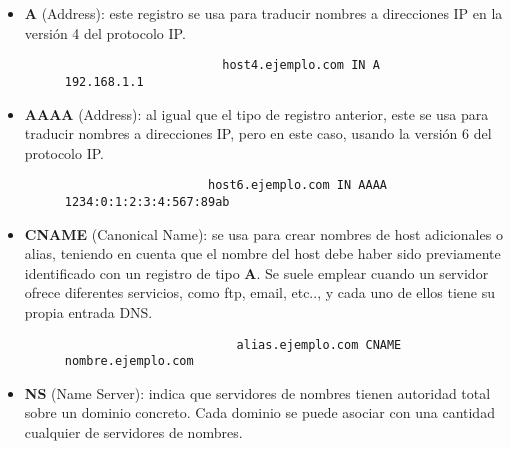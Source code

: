 \begin{itemize}
    \item \textbf{A} (Address): este registro se usa para traducir nombres a direcciones IP en la versión 4 del protocolo IP.

    \begin{figure}[H]
        \begin{tcolorbox}[sharp corners, colback=yellow!30, colframe=white!20]
            \scriptsize
            \begin{verbatim}
                      host4.ejemplo.com IN A 192.168.1.1\end{verbatim}
        \end{tcolorbox}
    \end{figure}
    \item \textbf{AAAA} (Address): al igual que el tipo de registro anterior, este se usa para traducir nombres a direcciones IP, pero en este caso, usando la versión 6 del protocolo IP.
    \begin{figure}[H]
        \begin{tcolorbox}[sharp corners, colback=yellow!30, colframe=white!20]
            \scriptsize
            \begin{verbatim}
                    host6.ejemplo.com IN AAAA 1234:0:1:2:3:4:567:89ab \end{verbatim}
        \end{tcolorbox}
    \end{figure}

    \item \textbf{CNAME} (Canonical Name): se usa para crear nombres de host adicionales o alias, teniendo en cuenta que el nombre del host debe haber sido previamente identificado con un registro de tipo \textbf{A}. Se suele emplear cuando un servidor ofrece diferentes servicios, como ftp, email, etc.., y cada uno de ellos tiene su propia entrada DNS.

        \begin{figure}[H]
        \begin{tcolorbox}[sharp corners, colback=yellow!30, colframe=white!20]
            \scriptsize
            \begin{verbatim}
                        alias.ejemplo.com CNAME nombre.ejemplo.com \end{verbatim}
        \end{tcolorbox}
    \end{figure}

    \item \textbf{NS} (Name Server): indica que servidores de nombres tienen autoridad total sobre un dominio concreto. Cada dominio se puede asociar con una cantidad cualquier de servidores de nombres.


\end{itemize}
